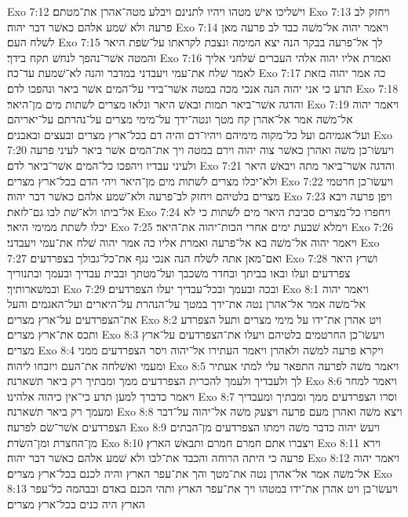 Exo 7:12  וישׁליכו אישׁ מטהו ויהיו לתנינם ויבלע מטה־אהרן את־מטתם׃
Exo 7:13  ויחזק לב פרעה ולא שׁמע אלהם כאשׁר דבר יהוה׃
Exo 7:14  ויאמר יהוה אל־משׁה כבד לב פרעה מאן לשׁלח העם׃
Exo 7:15  לך אל־פרעה בבקר הנה יצא המימה ונצבת לקראתו על־שׂפת היאר והמטה אשׁר־נהפך לנחשׁ תקח בידך׃
Exo 7:16  ואמרת אליו יהוה אלהי העברים שׁלחני אליך לאמר שׁלח את־עמי ויעבדני במדבר והנה לא־שׁמעת עד־כה׃
Exo 7:17  כה אמר יהוה בזאת תדע כי אני יהוה הנה אנכי מכה במטה אשׁר־בידי על־המים אשׁר ביאר ונהפכו לדם׃
Exo 7:18  והדגה אשׁר־ביאר תמות ובאשׁ היאר ונלאו מצרים לשׁתות מים מן־היאר׃
Exo 7:19  ויאמר יהוה אל־משׁה אמר אל־אהרן קח מטך ונטה־ידך על־מימי מצרים על־נהרתם על־יאריהם ועל־אגמיהם ועל כל־מקוה מימיהם ויהיו־דם והיה דם בכל־ארץ מצרים ובעצים ובאבנים׃
Exo 7:20  ויעשׂו־כן משׁה ואהרן כאשׁר צוה יהוה וירם במטה ויך את־המים אשׁר ביאר לעיני פרעה ולעיני עבדיו ויהפכו כל־המים אשׁר־ביאר לדם׃
Exo 7:21  והדגה אשׁר־ביאר מתה ויבאשׁ היאר ולא־יכלו מצרים לשׁתות מים מן־היאר ויהי הדם בכל־ארץ מצרים׃
Exo 7:22  ויעשׂו־כן חרטמי מצרים בלטיהם ויחזק לב־פרעה ולא־שׁמע אלהם כאשׁר דבר יהוה׃
Exo 7:23  ויפן פרעה ויבא אל־ביתו ולא־שׁת לבו גם־לזאת׃
Exo 7:24  ויחפרו כל־מצרים סביבת היאר מים לשׁתות כי לא יכלו לשׁתת ממימי היאר׃
Exo 7:25  וימלא שׁבעת ימים אחרי הכות־יהוה את־היאר׃
Exo 7:26  ויאמר יהוה אל־משׁה בא אל־פרעה ואמרת אליו כה אמר יהוה שׁלח את־עמי ויעבדני׃
Exo 7:27  ואם־מאן אתה לשׁלח הנה אנכי נגף את־כל־גבולך בצפרדעים׃
Exo 7:28  ושׁרץ היאר צפרדעים ועלו ובאו בביתך ובחדר משׁכבך ועל־מטתך ובבית עבדיך ובעמך ובתנוריך ובמשׁארותיך׃
Exo 7:29  ובכה ובעמך ובכל־עבדיך יעלו הצפרדעים׃
Exo 8:1  ויאמר יהוה אל־משׁה אמר אל־אהרן נטה את־ידך במטך על־הנהרת על־היארים ועל־האגמים והעל את־הצפרדעים על־ארץ מצרים׃
Exo 8:2  ויט אהרן את־ידו על מימי מצרים ותעל הצפרדע ותכס את־ארץ מצרים׃
Exo 8:3  ויעשׂו־כן החרטמים בלטיהם ויעלו את־הצפרדעים על־ארץ מצרים׃
Exo 8:4  ויקרא פרעה למשׁה ולאהרן ויאמר העתירו אל־יהוה ויסר הצפרדעים ממני ומעמי ואשׁלחה את־העם ויזבחו ליהוה׃
Exo 8:5  ויאמר משׁה לפרעה התפאר עלי למתי אעתיר לך ולעבדיך ולעמך להכרית הצפרדעים ממך ומבתיך רק ביאר תשׁארנה׃
Exo 8:6  ויאמר למחר ויאמר כדברך למען תדע כי־אין כיהוה אלהינו׃
Exo 8:7  וסרו הצפרדעים ממך ומבתיך ומעבדיך ומעמך רק ביאר תשׁארנה׃
Exo 8:8  ויצא משׁה ואהרן מעם פרעה ויצעק משׁה אל־יהוה על־דבר הצפרדעים אשׁר־שׂם לפרעה׃
Exo 8:9  ויעשׂ יהוה כדבר משׁה וימתו הצפרדעים מן־הבתים מן־החצרת ומן־השׂדת׃
Exo 8:10  ויצברו אתם חמרם חמרם ותבאשׁ הארץ׃
Exo 8:11  וירא פרעה כי היתה הרוחה והכבד את־לבו ולא שׁמע אלהם כאשׁר דבר יהוה׃
Exo 8:12  ויאמר יהוה אל־משׁה אמר אל־אהרן נטה את־מטך והך את־עפר הארץ והיה לכנם בכל־ארץ מצרים׃
Exo 8:13  ויעשׂו־כן ויט אהרן את־ידו במטהו ויך את־עפר הארץ ותהי הכנם באדם ובבהמה כל־עפר הארץ היה כנים בכל־ארץ מצרים׃
